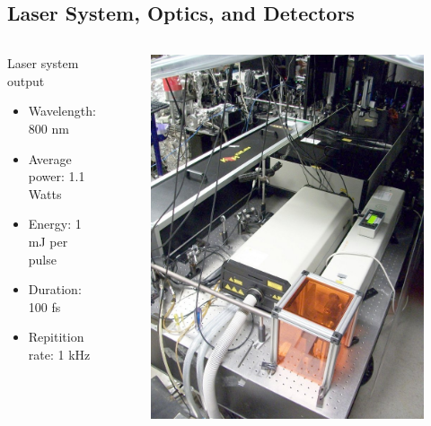 \documentclass{beamer}
\begin{document}
\subsection{Laser System, Optics, and Detectors}
\begin{frame}
\begin{columns}
\begin{block}{Laser system output}
\begin{itemize}
\item Wavelength: 800 nm
\item Average power: 1.1 Watts
\item Energy: 1 mJ per pulse
\item Duration: 100 fs
\item Repitition rate: 1 kHz
\end{itemize}
\end{block}
\begin{figure}
\centering
\includegraphics[height=0.8\textheight]{lasers}
\end{figure}
\end{columns}
\end{frame}
\end{document}
